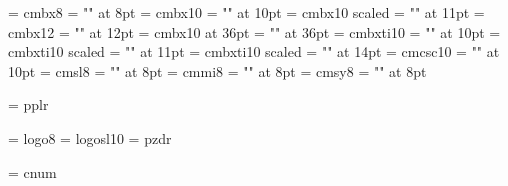 %
\font\eneightbf = cmbx8
\font\zheightbf = "\hei" at 8pt
\def\eightbf{\eneightbf\letfont\zheightbf}
\font\entenbf = cmbx10
\font\zhtenbf = "\hei" at 10pt
\def\tenbf{\entenbf\letfont\zhtenbf}
\font\enelevenbf = cmbx10 scaled \magstephalf
\font\zhelevenbf = "\hei" at 11pt
\def\elevenbf{\enelevenbf\letfont\zhelevenbf}
\font\entwelvebf = cmbx12
\font\zhtwelvebf = "\hei" at 12pt
\def\twelvebf{\entwelvebf\letfont\zhtwelvebf}
\font\enthirtysixbf = cmbx10 at 36pt
\font\zhthirtysixbf = "\hei" at 36pt
\def\thirtysixbf{\enthirtysixbf\letfont\zhthirtysixbf}
%
\font\entenbi = cmbxti10
\font\zhtenbi = "\hei" at 10pt
\def\tenbi{\entenbi\letfont\zhtenbi}
\font\enelevenbi= cmbxti10 scaled \magstephalf
\font\zhelevenbi = "\hei" at 11pt
\def\elevenbi{\enelevenbi\letfont\zhelevenbi}
\font\enfourteenbi= cmbxti10 scaled 
\font\zhfourteenbi = "\hei" at 14pt
\def\fourteenbi{\enfourteenbi\letfont\zhfourteenbi}
%
\font\entensc = cmcsc10
\font\zhtensc = "\fang" at 10pt
\def\tensc{\entensc\letfont\zhtensc}
\font\eneightsl = cmsl8
\font\zheightsl = "\fang" at 8pt
\def\eightsl{\eneightsl\letfont\zheightsl}
\font\eneighti = cmmi8
\font\zheighti = "\kai" at 8pt
\def\eighti{\eneighti\letfont\zheighti}
\font\eneightsy = cmsy8
\font\zheightsy = "\song" at 8pt
\def\eightsy{\eneightsy\letfont\zheightsy}

 
%
\font\tenpal = pplr

% 
\font\eightlogo = logo8
\font\logosl = logosl10
\font\handfont = pzdr

\ifmsdos
   \font\cnum = cnum %
   \let\chapternumeralfont = \cnum
\fi

\def\undefinedfont{\errmessage{Undefined font}}

% 
\def\clearfonts{\let\rm = \undefinedfont \let\bf = \undefinedfont
   \let\it = \undefinedfont \let\bi = \undefinedfont
   \let\tt = \undefinedfont \let\bt = \undefinedfont
   \let\sc = \undefinedfont
   \let\ss = \undefinedfont
}

